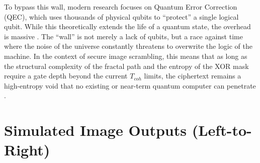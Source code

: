 \documentclass[12pt,fleqn]{article}
\begin{document}
To bypass this wall, modern research focuses on Quantum Error Correction (QEC), which uses thousands of physical qubits to ``protect'' a single logical qubit. While this theoretically extends the life of a quantum state, the overhead is massive \cite{fowler2012surface}. The ``wall'' is not merely a lack of qubits, but a race against time where the noise of the universe constantly threatens to overwrite the logic of the machine. In the context of secure image scrambling, this means that as long as the structural complexity of the fractal path and the entropy of the XOR mask require a gate depth beyond the current $T_{coh}$ limits, the ciphertext remains a high-entropy void that no existing or near-term quantum computer can penetrate \cite{terhal2015quantum}.

\section{Simulated Image Outputs (Left-to-Right)}
\end{document}
